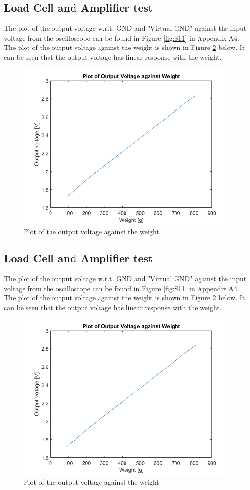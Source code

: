 \documentclass[class=report,11pt,crop=false]{standalone}
\begin{document}
	\subsection{Load Cell and Amplifier test}
	The plot of the output voltage w.r.t. GND and "Virtual GND" against the input voltage from the oscilloscope can be found in Figure \ref{fig:S11} in Appendix A4. The plot of the output voltage against the weight is shown in Figure \ref{fig:S12} below. It can be seen that the output voltage has linear response with the weight. 
	\begin{figure}[h!]
		\centering
		\includegraphics[width=0.4\linewidth]{Figures/Result2.png}
		\caption{Plot of the output voltage against the weight}
		\label{fig:S12}
	\end{figure}
	
	\subsection{Load Cell and Amplifier test}
	The plot of the output voltage w.r.t. GND and "Virtual GND" against the input voltage from the oscilloscope can be found in Figure \ref{fig:S11} in Appendix A4. The plot of the output voltage against the weight is shown in Figure \ref{fig:S12} below. It can be seen that the output voltage has linear response with the weight. 
	
	\begin{figure}[h!]
		\centering
		\includegraphics[width=0.4\linewidth]{Figures/Result2.png}
		\caption{Plot of the output voltage against the weight}
		\label{fig:S12}
	\end{figure}
	
	\ifstandalone
	
	\printnoidxglossary[type=\acronymtype,nonumberlist]
	\fi
\end{document}

